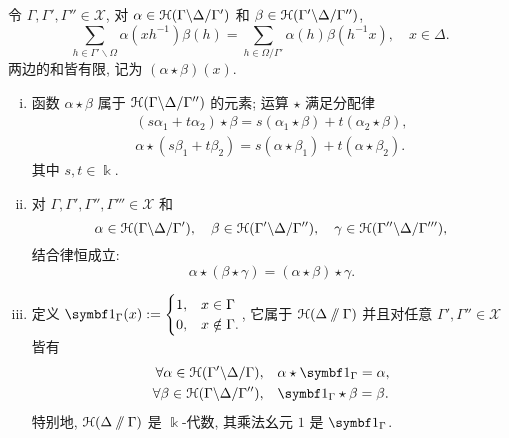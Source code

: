 \begin{definition-theorem}\label{def:convolution}
	令 $\Gamma, \Gamma', \Gamma'' \in \mathcal{X}$, 对 $\alpha \in \EuScript{H}(\Gamma \backslash \Delta / \Gamma')$ 和 $\beta \in \EuScript{H}(\Gamma' \backslash \Delta /\Gamma'')$,
	\begin{equation*}
		\sum_{h \in \Gamma' \backslash \Omega} \alpha(xh^{-1})\beta(h) =
		\sum_{h \in \Omega / \Gamma'} \alpha(h) \beta(h^{-1}x), \quad x \in \Delta.
	\end{equation*}
	两边的和皆有限, 记为 $(\alpha \star \beta)(x)$.
	\begin{enumerate}[(i)]
		\item 函数 $\alpha \star \beta$ 属于 $\EuScript{H}(\Gamma \backslash \Delta / \Gamma'')$ 的元素; 运算 $\star$ 满足分配律
		\begin{gather*}
			(s \alpha_1 + t \alpha_2) \star \beta = s (\alpha_1 \star \beta) + t (\alpha_2 \star \beta), \\
			\alpha \star (s\beta_1 + t\beta_2) = s(\alpha \star \beta_1) + t (\alpha \star \beta_2).
		\end{gather*}
		其中 $s,t \in \Bbbk$.
		\item 对 $\Gamma, \Gamma', \Gamma'', \Gamma''' \in \mathcal{X}$ 和
		\[ \alpha \in \EuScript{H}(\Gamma \backslash \Delta / \Gamma'), \quad \beta \in \EuScript{H}(\Gamma' \backslash \Delta /\Gamma''), \quad \gamma \in \EuScript{H}(\Gamma'' \backslash \Delta / \Gamma'''), \]
		结合律恒成立:
		\[ \alpha \star (\beta \star \gamma) = (\alpha \star \beta) \star \gamma. \]
		\item 定义 $\charfcn_\Gamma (x) := \begin{cases} 1, & x \in \Gamma \\ 0, & x \notin \Gamma. \end{cases}$, 它属于 $\EuScript{H}(\Delta \sslash \Gamma)$ 并且对任意 $\Gamma', \Gamma'' \in \mathcal{X}$ 皆有
		\begin{align*}
			\forall \alpha \in \EuScript{H}(\Gamma' \backslash \Delta /\Gamma), & \quad \alpha \star \charfcn_\Gamma = \alpha, \\
			\forall \beta \in \EuScript{H}(\Gamma \backslash \Delta / \Gamma''), & \quad \charfcn_\Gamma \star \beta = \beta.
		\end{align*}
		特别地, $\EuScript{H}(\Delta \sslash \Gamma)$ 是 $\Bbbk$-代数, 其乘法幺元 $1$ 是 $\charfcn_\Gamma$.
	\end{enumerate}
\end{definition-theorem}
